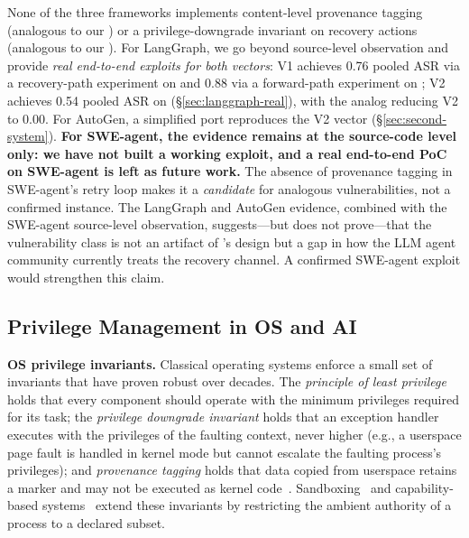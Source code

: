None of the three frameworks implements content-level provenance tagging (analogous to our \trustorigin{}) or a privilege-downgrade invariant on recovery actions (analogous to our \reauthgate{}). For LangGraph, we go beyond source-level observation and provide \emph{real end-to-end exploits for both vectors}: V1 achieves 0.76 pooled ASR via a recovery-path experiment on  and 0.88 via a forward-path experiment on ; V2 achieves 0.54 pooled ASR on  (\S\ref{sec:langgraph-real}), with the \reauthgate{} analog reducing V2 to 0.00. For AutoGen, a simplified port reproduces the V2 vector (\S\ref{sec:second-system}). \textbf{For SWE-agent, the evidence remains at the source-code level only: we have not built a working exploit, and a real end-to-end PoC on SWE-agent is left as future work.} The absence of provenance tagging in SWE-agent's retry loop makes it a \emph{candidate} for analogous vulnerabilities, not a confirmed instance. The LangGraph and AutoGen evidence, combined with the SWE-agent source-level observation, suggests---but does not prove---that the vulnerability class is not an artifact of \system{}'s design but a gap in how the LLM agent community currently treats the recovery channel. A confirmed SWE-agent exploit would strengthen this claim.

\subsection{Privilege Management in OS and AI}
\label{sec:related-privilege}

\textbf{OS privilege invariants.} Classical operating systems enforce a small set of invariants that have proven robust over decades. The \emph{principle of least privilege}~\cite{saltzer1975protection} holds that every component should operate with the minimum privileges required for its task; the \emph{privilege downgrade invariant} holds that an exception handler executes with the privileges of the faulting context, never higher (e.g., a userspace page fault is handled in kernel mode but cannot escalate the faulting process's privileges); and \emph{provenance tagging} holds that data copied from userspace retains a  marker and may not be executed as kernel code~\cite{levine2003system,bovet2005understanding}. Sandboxing~\cite{capsules,seccomp} and capability-based systems~\cite{capabilities} extend these invariants by restricting the ambient authority of a process to a declared subset.

